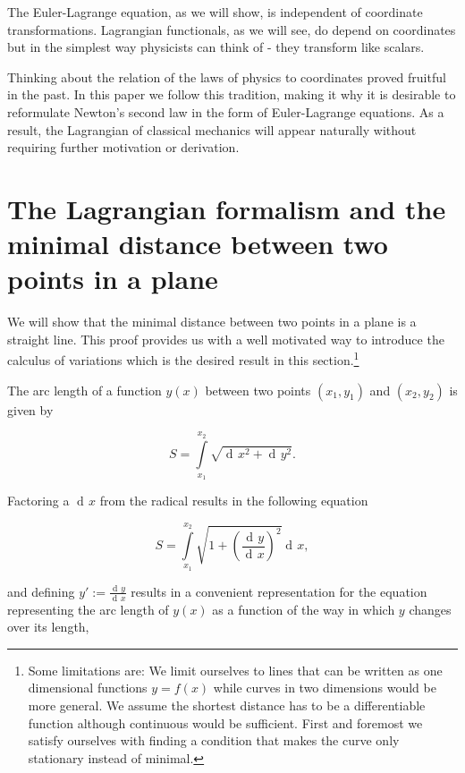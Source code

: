\documentclass[prb,preprint]{revtex4-1}
\DeclareMathOperator{\dd}{d\!}
\begin{document}
The Euler-Lagrange equation, as we will show, is independent of coordinate transformations. Lagrangian functionals, as we will see, do depend on coordinates but in the simplest way physicists can think of - they transform like scalars. 

Thinking about the relation of the laws of physics to coordinates proved fruitful in the past. In this paper we follow this tradition, making it why it is desirable to reformulate Newton's second law in the form of Euler-Lagrange equations. As a result, the Lagrangian of classical mechanics will appear naturally without requiring further motivation or derivation. 


\section{The Lagrangian formalism and the minimal distance between two points in a plane \cite{Klopper}}\label{distance} %

We will show that the minimal distance between two points in a plane is a straight line. This proof provides us with a well motivated way to introduce the calculus of variations which is the desired result in this section.\footnote{Some limitations are:
We limit ourselves to lines that can be written as one dimensional functions $y=f(x)$ while curves in two dimensions would be more general. We assume the shortest distance has to be a differentiable function although continuous would be sufficient. First and foremost we satisfy ourselves with finding a condition that makes the curve only stationary instead of minimal.}

The arc length of a function $y(x)$ between two points $(x_1,y_1)$ and $(x_2,y_2)$ is given by

\begin{equation}
S=\int\limits_{x_1}^{x_2}\sqrt{\dd x^2 + \dd y^2}.
\end{equation}

Factoring a $\dd x$ from the radical results in the following equation

\begin{equation}
S= \int\limits_{x_1}^{x_2}\sqrt{1 + \left(\frac{\dd y}{\dd x}\right)^2} \dd x,
\end{equation}

and defining $y' := \frac{\dd y}{\dd x}$ results in a convenient representation for the equation representing the arc length of $y(x)$ as a function of the way in which $y$ changes over its length, %
\end{document}

